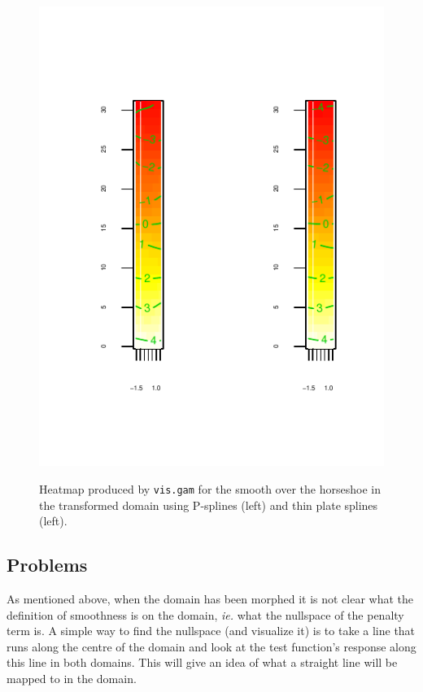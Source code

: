 \documentclass[a4paper,10pt]{amsart}
\begin{document}
\begin{figure}
\centering
\includegraphics[trim=0in 0.5in 0in 0in]{figs/hsvisgam.pdf} \\
\caption{Heatmap produced by \texttt{vis.gam} for the smooth over the horseshoe in the transformed domain using P-splines (left) and thin plate splines (left).}
\label{hsvisgam}
\end{figure}

\subsection{Problems}

As mentioned above, when the domain has been morphed it is not clear what the definition of smoothness is on the domain, \emph{ie.} what the nullspace of the penalty term is. A simple way to find the nullspace (and visualize it) is to take a line that runs along the centre of the domain and look at the test function's response along this line in both domains. This will give an idea of what a straight line will be mapped to in the domain.
\end{document}
